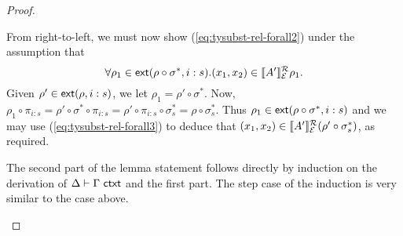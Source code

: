 \begin{proof}
\begin{enumerate}
\begin{description}
      From right-to-left, we must now show
      (\ref{eq:tysubst-rel-forall2}) under the assumption that
      \begin{equation}
        \label{eq:tysubst-rel-forall3}
        \forall \rho_1 \in \mathsf{ext}(\rho \circ \sigma^*,i:s). (x_1,x_2) \in \llbracket A' \rrbracket^{\mathcal{R}}_{\mathcal{E}}{\rho_1}.
      \end{equation}
      Given $\rho' \in \mathsf{ext}(\rho,i:s)$, we let $\rho_1 = \rho'
      \circ \sigma^*$. Now, $\rho_1 \circ \pi_{i:s} = \rho' \circ
      \sigma^* \circ \pi_{i:s} = \rho' \circ \pi_{i:s} \circ
      \sigma_s^{*} = \rho \circ \sigma_s^{*}$. Thus $\rho_1 \in
      \mathsf{ext}(\rho \circ \sigma^*,i:s)$ and we may use
      (\ref{eq:tysubst-rel-forall3}) to deduce that $(x_1,x_2) \in
      \llbracket A' \rrbracket^{\mathcal{R}}_{\mathcal{E}}{(\rho' \circ \sigma_s^{*})}$, as required.
    \end{description}
    The second part of the lemma statement follows directly by
    induction on the derivation of $\Delta \vdash \Gamma \textsf{ ctxt}$ and
    the first part. The step case of the induction is very similar to
    the  case above.
  \end{enumerate}
\end{proof}
